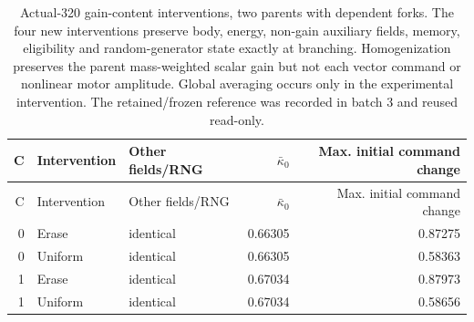 \begin{longtable}{rllrr}
\caption{Actual-320 gain-content interventions, two parents with dependent forks. The four new interventions preserve body, energy, non-gain auxiliary fields, memory, eligibility and random-generator state exactly at branching. Homogenization preserves the parent mass-weighted scalar gain but not each vector command or nonlinear motor amplitude. Global averaging occurs only in the experimental intervention. The retained/frozen reference was recorded in batch 3 and reused read-only.}\label{tab:gain-parent}\\
\toprule
C & Intervention & Other fields/RNG & $\bar\kappa_0$ & Max. initial command change \\
\midrule
\endfirsthead
\toprule
C & Intervention & Other fields/RNG & $\bar\kappa_0$ & Max. initial command change \\
\midrule
\endhead
0 & Erase & identical & 0.66305 & 0.87275 \\
0 & Uniform & identical & 0.66305 & 0.58363 \\
1 & Erase & identical & 0.67034 & 0.87973 \\
1 & Uniform & identical & 0.67034 & 0.58656 \\
\bottomrule
\end{longtable}

\endgroup
